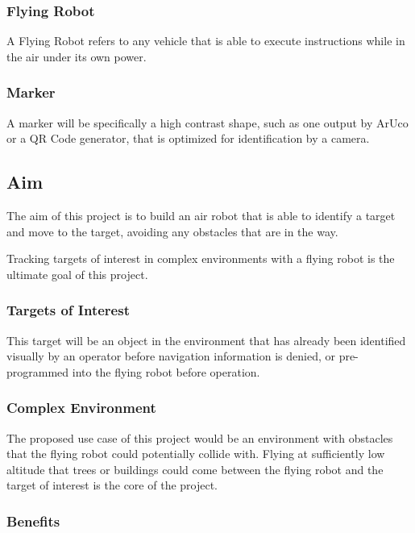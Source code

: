 \documentclass{article}
\begin{document}
		\subsubsection{Flying Robot}
		
		A Flying Robot refers to any vehicle that is able to execute instructions while in the air under its own power.
		
		\subsubsection{Marker}
		
		A marker will be specifically a high contrast shape, such as one output by ArUco or a QR Code generator, that is optimized for identification by a camera.
		
	\subsection{Aim}
	
	The aim of this project is to build an air robot that is able to identify a target and move to the target, avoiding any obstacles that are in the way. 
	
	Tracking targets of interest in complex environments with a flying robot is the ultimate goal of this project. 
	
		\subsubsection{Targets of Interest}
		
		This target will be an object in the environment that has already been identified visually by an operator before navigation information is denied, or pre-programmed into the flying robot before operation.
		
		\subsubsection{Complex Environment}
		
		The proposed use case of this project would be an environment with obstacles that the flying robot could potentially collide with. Flying at sufficiently low altitude that trees or buildings could come between the flying robot and the target of interest is the core of the project.
		
		\subsubsection{Benefits}
		
\end{document}
